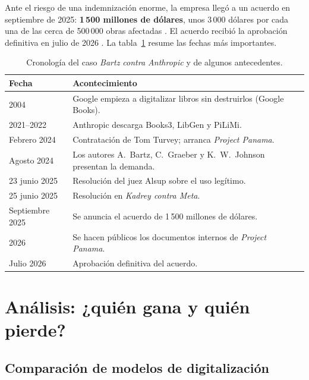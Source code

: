 \documentclass[11pt,a4paper,twoside,openright]{book}
\begin{document}
Ante el riesgo de una indemnización enorme, la empresa llegó a un acuerdo en
septiembre de 2025: \textbf{1\,500 millones de dólares}, unos 3\,000 dólares por
cada una de las cerca de 500\,000 obras afectadas \cite{npr2025}. El acuerdo
recibió la aprobación definitiva en julio de 2026 \cite{latimes2026}. La
tabla~\ref{tab:cronologia} resume las fechas más importantes.

\begin{table}[htbp]
  \centering
  \caption[Cronología del caso]{Cronología del caso \textit{Bartz contra Anthropic}
    y de algunos antecedentes.}
  \label{tab:cronologia}
  \begin{tabular}{@{}lp{}@{}}
    \toprule
    \textbf{Fecha} & \textbf{Acontecimiento} \\
    \midrule
    2004           & Google empieza a digitalizar libros sin destruirlos (Google Books). \\
    2021--2022     & Anthropic descarga Books3, LibGen y PiLiMi. \\
    Febrero 2024   & Contratación de Tom Turvey; arranca \textit{Project Panama}. \\
    Agosto 2024    & Los autores A.~Bartz, C.~Graeber y K.~W.~Johnson presentan la demanda. \\
    23 junio 2025  & Resolución del juez Alsup sobre el uso legítimo. \\
    25 junio 2025  & Resolución en \textit{Kadrey contra Meta}. \\
    Septiembre 2025 & Se anuncia el acuerdo de 1\,500 millones de dólares. \\
    2026           & Se hacen públicos los documentos internos de \textit{Project Panama}. \\
    Julio 2026     & Aprobación definitiva del acuerdo. \\
    \bottomrule
  \end{tabular}
\end{table}

\chapter{Análisis: ¿quién gana y quién pierde?}

\section{Comparación de modelos de digitalización}
\end{document}

